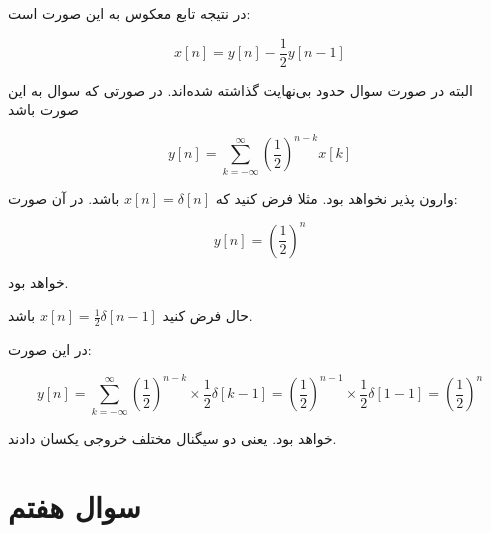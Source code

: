 \documentclass[12pt]{article}
\begin{document}
\begin{enumerate}[label = \harfi*)]
در نتیجه تابع معکوس به این صورت است:

$$x[n] = y[n] - \frac{1}{2}y[n-1]$$

البته در صورت سوال حدود بی‌نهایت گذاشته شده‌اند. در صورتی که سوال به این صورت باشد	

$$
y[n] =\sum_{k=-\infty}^{\infty}\left(\frac{1}{2}\right)^{n-k} x[k]
$$

وارون پذیر نخواهد بود. مثلا فرض کنید که
$x[n] = \delta[n]$
باشد. در آن صورت:

$$y[n] = (\frac{1}{2})^n$$

خواهد بود.

حال فرض کنید
$x[n] = \frac{1}{2} \delta[n-1]$
باشد.

در این صورت:

$$
y[n] =\sum_{k=-\infty}^{\infty}\left(\frac{1}{2}\right)^{n-k} \times \frac{1}{2} \delta[k-1]  = (\frac{1}{2})^{n-1} \times \frac{1}{2} \delta[1-1] = (\frac{1}{2})^{n}
$$

خواهد بود. یعنی دو سیگنال مختلف خروجی یکسان دادند.

\end{enumerate}


\section{سوال هفتم}
\end{document}
